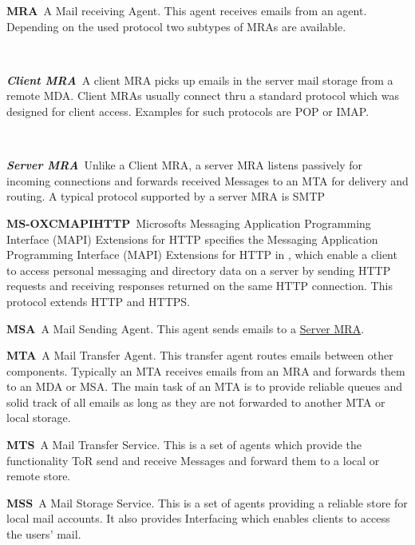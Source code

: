 \documentclass[a4paper,appendixprefix,pdfusetitle,twocolumn,fontsize=8pt,draft,DIV=calc]{scrbook}
\newenvironment{entry}{\par\leavevmode\hangpara{1.5mm}{1}\ignorespaces}{\RaggedRight\par}
\newcommand*{\mainentry}[2]{{\bfseries{#1\label{def:#1}}}~#2\par}
\newcommand*{\subentry}[2]{\par~\begin{minipage}{\columnwidth-0.6cm}{\bfseries{\itshape{#1\label{def:#1}}}}~#2\end{minipage}}
\newcommand*{\defref}[1]{\hyperref[def:#1]{#1}}
\begin{document}
\begin{entry}
	\mainentry{MRA}{A Mail receiving Agent. This agent receives emails from an agent. Depending on the used protocol two subtypes of MRAs are available.}
	\subentry{Client MRA}{A client MRA picks up emails in the server mail storage from a remote MDA. Client MRAs usually connect thru a standard protocol which was designed for client access. Examples for such protocols are POP or IMAP.}
	\subentry{Server MRA}{Unlike a Client MRA, a server MRA listens passively for incoming connections and forwards received Messages to an MTA for delivery and routing. A typical protocol supported by a server MRA is SMTP}
\end{entry}

\begin{entry}
	\mainentry{MS-OXCMAPIHTTP}{Microsofts Messaging Application Programming Interface (MAPI) 
		Extensions for HTTP specifies the Messaging Application Programming Interface (MAPI) Extensions for HTTP in \cite{ms-oxcmapihttp}, which enable a client to access personal messaging and directory data on a server by sending HTTP requests and receiving responses returned on the same HTTP connection. This protocol extends HTTP and HTTPS.}
\end{entry}

\begin{entry}
	\mainentry{MSA}{A Mail Sending Agent. This agent sends emails to a \defref{Server MRA}. }
\end{entry}

\begin{entry}
	\mainentry{MTA}{A Mail Transfer Agent. This transfer agent routes emails between other components. Typically an MTA receives emails from an MRA and forwards them to an MDA or MSA. The main task of an MTA is to provide reliable queues and solid track of all emails as long as they are not forwarded to another MTA or local storage.}
\end{entry}

\begin{entry}
	\mainentry{MTS}{A Mail Transfer Service. This is a set of agents which provide the functionality ToR send and receive Messages and forward them to a local or remote store.}
\end{entry}

\begin{entry}
	\mainentry{MSS}{A Mail Storage Service. This is a set of agents providing a reliable store for local mail accounts. It also provides Interfacing which enables clients to access the users' mail.}
\end{entry}
\end{document}
